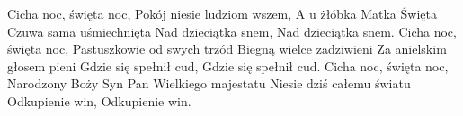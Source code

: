 \beginverse
Cicha noc, święta noc,
Pokój niesie ludziom wszem,
A u żłóbka Matka Święta
Czuwa sama uśmiechnięta
Nad dzieciątka snem,
Nad dzieciątka snem.
\endverse
\beginverse
Cicha noc, święta noc,
Pastuszkowie od swych trzód
Biegną wielce zadziwieni
Za anielskim głosem pieni
Gdzie się spełnił cud,
Gdzie się spełnił cud.
\endverse
\beginverse
Cicha noc, święta noc,
Narodzony Boży Syn
Pan Wielkiego majestatu
Niesie dziś całemu światu
Odkupienie win,
Odkupienie win.
\endverse
\endsong
